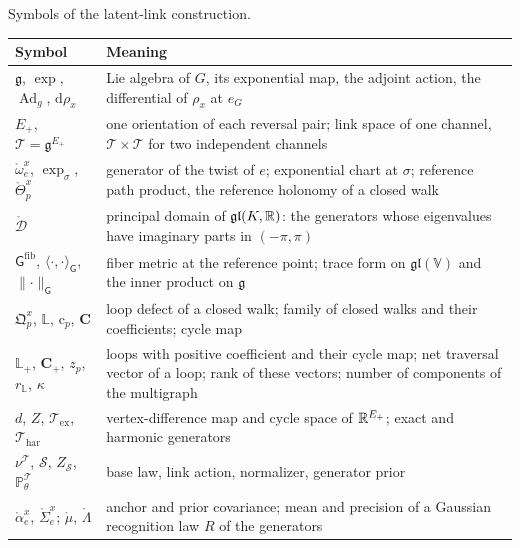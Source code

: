 \begin{sciencetable}{Symbols of the latent-link construction.}
\label{tab:link-notation}
\begin{tabularx}{\textwidth}{>{\raggedright\arraybackslash}p{}>{\raggedright\arraybackslash}X}
\toprule
\textbf{Symbol} & \textbf{Meaning} \\
\midrule
\(\mathfrak g\), \(\exp\), \(\operatorname{Ad}_g\), \(\mathrm d\rho_x\) & Lie algebra of \(G\), its exponential map, the adjoint action, the differential of \(\rho_x\) at \(e_G\) \\
\(E_+\), \(\mathscr T=\mathfrak g^{E_+}\) & one orientation of each reversal pair; link space of one channel, \(\mathscr T\times\mathscr T\) for two independent channels \\
\(\mathring\omega^x_e\), \(\exp_\sigma\), \(\mathring\Theta^x_p\) & generator of the twist of \(e\); exponential chart at \(\sigma\); reference path product, the reference holonomy of a closed walk \\
\(\mathring{\mathcal D}\) & principal domain of \(\mathfrak{gl}(K,\mathbb R)\): the generators whose eigenvalues have imaginary parts in \((-\pi,\pi)\) \\
\(\mathsf G^{\mathrm{fib}}\), \(\langle\cdot,\cdot\rangle_{\mathsf G}\), \(\lVert\cdot\rVert_{\mathsf G}\) & fiber metric at the reference point; trace form on \(\mathfrak{gl}(\mathbb V)\) and the inner product on \(\mathfrak g\) \\
\(\mathfrak Q^x_p\), \(\mathbb L\), \(\mathrm c_p\), \(\mathbf C\) & loop defect of a closed walk; family of closed walks and their coefficients; cycle map \\
\(\mathbb L_+\), \(\mathbf C_+\), \(z_p\), \(r_{\mathbb L}\), \(\kappa\) & loops with positive coefficient and their cycle map; net traversal vector of a loop; rank of these vectors; number of components of the multigraph \\
\(d\), \(Z\), \(\mathscr T_{\mathrm{ex}}\), \(\mathscr T_{\mathrm{har}}\) & vertex-difference map and cycle space of \(\mathbb R^{E_+}\); exact and harmonic generators \\
\(\nu^{\mathscr T}\), \(\mathscr S\), \(Z_{\mathscr S}\), \(\mathbb P^{\mathscr T}_\theta\) & base law, link action, normalizer, generator prior \\
\(\mathring\alpha^x_e\), \(\mathring\Sigma^x_e\); \(\mathring\mu\), \(\mathring\Lambda\) & anchor and prior covariance; mean and precision of a Gaussian recognition law \(R\) of the generators \\

\end{tabularx}
\end{sciencetable}
